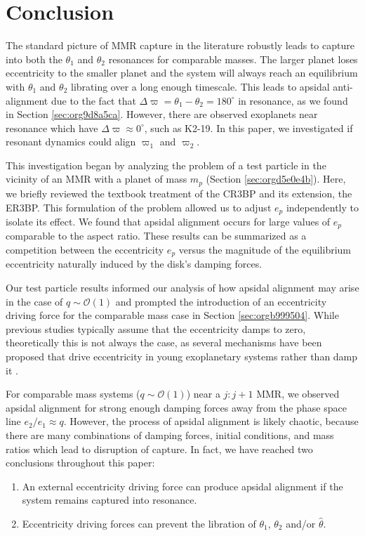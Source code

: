 \documentclass[usenatbib,twocolumn]{mnras}
\begin{document}
\section{Conclusion}
\label{sec:org192e6f5}
The standard picture of MMR capture in the literature robustly leads
to capture into both the \(\theta_1\) and \(\theta_2\) resonances for
comparable masses.  The larger planet loses eccentricity to the
smaller planet and the system will always reach an equilibrium with
\(\theta_1\) and \(\theta_2\) librating over a long enough timescale.
This leads to apsidal anti-alignment due to the fact that
\(\Delta\varpi=\theta_1-\theta_2=180^\circ\) in resonance, as we found
in Section \ref{sec:org9d8a5ca}.  However, there are
observed exoplanets near resonance which have
\(\Delta\varpi\approx0^\circ\), such as K2-19.  In this paper, we
investigated if resonant dynamics could align \(\varpi_1\) and
\(\varpi_2\).

This investigation began by analyzing the problem of a test particle
in the vicinity of an MMR with a planet of mass \(m_p\) (Section \ref{sec:orgd5e0e4b}).  Here, we briefly reviewed the textbook treatment
of the CR3BP and its extension, the ER3BP.  This formulation of the
problem allowed us to adjust \(e_p\) independently to isolate its
effect.  We found that apsidal alignment occurs for large values of
\(e_p\) comparable to the aspect ratio. These results can be summarized
as a competition between the eccentricity \(e_p\) versus the magnitude
of the equilibrium eccentricity naturally induced by the disk's
damping forces.

Our test particle results informed our analysis of how apsidal
alignment may arise in the case of \(q\sim\mathcal{O}(1)\) and prompted
the introduction of an eccentricity driving force for the comparable
mass case in Section \ref{sec:orgb999504}.  While previous studies typically
assume that the eccentricity damps to zero, theoretically this is not
always the case, as several mechanisms have been proposed that drive
eccentricity in young exoplanetary systems rather than damp it
\citep{ragusa17_eccen_evolut_durin_planet_disc_inter,goldreich03_eccen_evolut_planet_gaseous_disks,teyssandier17_secul_evolut_eccen_protop_discs}.

For comparable mass systems (\(q\sim \mathcal O(1)\)) near a \(j:j+1\)
MMR, we observed apsidal alignment for strong enough damping forces
away from the phase space line \(e_2/e_1 \approx q\). However,
the process of apsidal alignment is likely chaotic, because
there are many combinations of damping forces, initial conditions,
and mass ratios which lead to disruption of capture.
In fact, we
have reached two conclusions throughout this paper:
\begin{enumerate}[label=\arabic*.]
  \item An external eccentricity driving force can produce
apsidal alignment if the system remains captured into resonance.
  \item Eccentricity driving forces can prevent the libration of $\theta_1$, $\theta_2$ and/or $\hat\theta$.
\end{enumerate}
\end{document}
